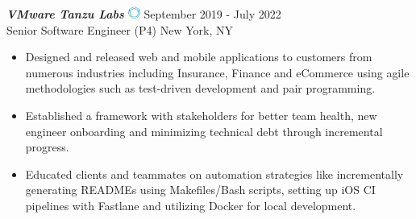{\sl \textbf{VMware Tanzu Labs} \includegraphics[width=0.4cm]{./images/tanzu-labs.png}} \hfill September 2019 - July 2022 \\
Senior Software Engineer (P4) \hfill New York, NY
\begin{itemize}
    \item Designed and released web and mobile applications to customers from numerous industries including Insurance, Finance and eCommerce using agile methodologies such as test-driven development and pair programming.
    \item Established a framework with stakeholders for better team health, new engineer onboarding and minimizing technical debt through incremental progress.
    \item Educated clients and teammates on automation strategies like incrementally generating READMEs using Makefiles/Bash scripts, setting up iOS CI pipelines with Fastlane and utilizing Docker for local development.
\end{itemize}
